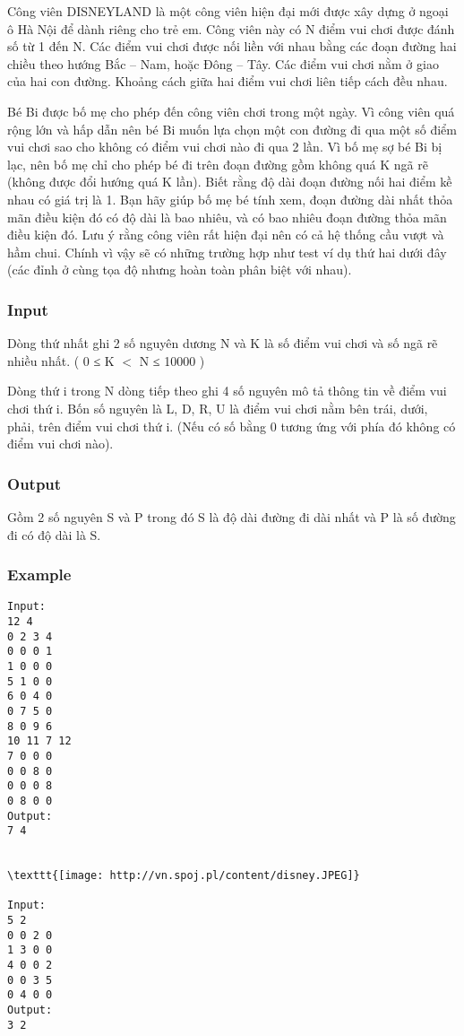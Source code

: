 



   Công viên DISNEYLAND là một công viên hiện đại mới được xây dựng ở ngoại ô Hà Nội để dành riêng cho trẻ em. Công viên này có N điểm vui chơi được đánh số từ 1 đến N. Các điểm vui chơi được nối liền với nhau bằng các đoạn đường hai chiều theo hướng Bắc – Nam, hoặc Đông – Tây. Các điểm vui chơi nằm ở giao của hai con đường. Khoảng cách giữa hai điểm vui chơi liên tiếp cách đều nhau.  

   Bé Bi được bố mẹ cho phép đến công viên chơi trong một ngày. Vì công viên quá rộng lớn và hấp dẫn nên bé Bi muốn lựa chọn một con đường đi qua một số điểm vui chơi sao cho không có điểm vui chơi nào đi qua 2 lần. Vì bố mẹ sợ bé Bi bị lạc, nên bố mẹ chỉ cho phép bé đi trên đoạn đường gồm không quá K ngã rẽ (không được đổi hướng quá K lần). Biết rằng độ dài đoạn đường nối hai điểm kề nhau có giá trị là 1. Bạn hãy giúp bố mẹ bé tính xem, đoạn đường dài nhất thỏa mãn điều kiện đó có độ dài là bao nhiêu, và có bao nhiêu đoạn đường thỏa mãn điều kiện đó. Lưu ý rằng công viên rất hiện đại nên có cả hệ thống cầu vượt và hầm chui. Chính vì vậy sẽ có những trường hợp như test ví dụ thứ hai dưới đây (các đỉnh ở cùng tọa độ nhưng hoàn toàn phân biệt với nhau).  

\subsubsection{   Input  }

   Dòng thứ nhất ghi 2 số nguyên dương N và K là số điểm vui chơi và số ngã rẽ nhiều nhất. ( 0 ≤ K $<$ N ≤ 10000 )  

   Dòng thứ i trong N dòng tiếp theo ghi 4 số nguyên mô tả thông tin về điểm vui chơi thứ i. Bốn số nguyên là L, D, R, U là điểm vui chơi nằm bên trái, dưới, phải, trên điểm vui chơi thứ i. (Nếu có số bằng 0 tương ứng với phía đó không có điểm vui chơi nào).  

\subsubsection{   Output  }

   Gồm 2 số nguyên S và P trong đó S là độ dài đường đi dài nhất và P là số đường đi có độ dài là S.  

\subsubsection{   Example  }
\begin{verbatim}
Input:
12 4
0 2 3 4
0 0 0 1
1 0 0 0
5 1 0 0
6 0 4 0
0 7 5 0
8 0 9 6
10 11 7 12
7 0 0 0
0 0 8 0
0 0 0 8
0 8 0 0
Output:
7 4


\texttt{[image: http://vn.spoj.pl/content/disney.JPEG]}

Input:
5 2
0 0 2 0
1 3 0 0
4 0 0 2
0 0 3 5
0 4 0 0
Output:
3 2

\end{verbatim}